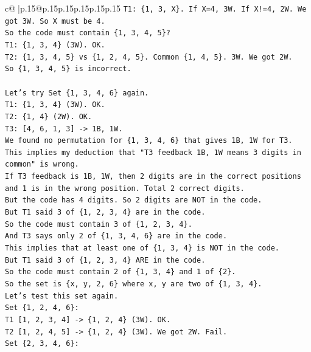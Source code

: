 \documentclass{article}
\begin{document}
{\begin{supertabular}{c@{$\;$}|p{.15\linewidth}@{}p{.15\linewidth}p{.15\linewidth}p{.15\linewidth}p{.15\linewidth}p{.15\linewidth}}
{{{\texttt{T1: \{1, 3, X\}. If X=4, 3W. If X!=4, 2W. We got 3W. So X must be 4.} \\
\texttt{So the code must contain \{1, 3, 4, 5\}?} \\
\texttt{T1: \{1, 3, 4\} (3W). OK.} \\
\texttt{T2: \{1, 3, 4, 5\} vs \{1, 2, 4, 5\}. Common \{1, 4, 5\}. 3W. We got 2W.} \\
\texttt{So \{1, 3, 4, 5\} is incorrect.} \\
\\ 
\texttt{Let's try Set \{1, 3, 4, 6\} again.} \\
\texttt{T1: \{1, 3, 4\} (3W). OK.} \\
\texttt{T2: \{1, 4\} (2W). OK.} \\
\texttt{T3: {[}4, 6, 1, 3{]} {-}> 1B, 1W.} \\
\texttt{We found no permutation for \{1, 3, 4, 6\} that gives 1B, 1W for T3.} \\
\texttt{This implies my deduction that "T3 feedback 1B, 1W means 3 digits in common" is wrong.} \\
\texttt{If T3 feedback is 1B, 1W, then 2 digits are in the correct positions and 1 is in the wrong position. Total 2 correct digits.} \\
\texttt{But the code has 4 digits. So 2 digits are NOT in the code.} \\
\texttt{But T1 said 3 of \{1, 2, 3, 4\} are in the code.} \\
\texttt{So the code must contain 3 of \{1, 2, 3, 4\}.} \\
\texttt{And T3 says only 2 of \{1, 3, 4, 6\} are in the code.} \\
\texttt{This implies that at least one of \{1, 3, 4\} is NOT in the code.} \\
\texttt{But T1 said 3 of \{1, 2, 3, 4\} ARE in the code.} \\
\texttt{So the code must contain 2 of \{1, 3, 4\} and 1 of \{2\}.} \\
\texttt{So the set is \{x, y, 2, 6\} where x, y are two of \{1, 3, 4\}.} \\
\texttt{Let's test this set again.} \\
\texttt{Set \{1, 2, 4, 6\}:} \\
\texttt{T1 {[}1, 2, 3, 4{]} {-}> \{1, 2, 4\} (3W). OK.} \\
\texttt{T2 {[}1, 2, 4, 5{]} {-}> \{1, 2, 4\} (3W). We got 2W. Fail.} \\
\texttt{Set \{2, 3, 4, 6\}:} \\
}}}
\end{supertabular}}
\end{document}
